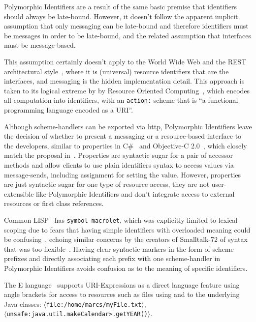\documentclass[preprint]{sigplanconf}
\begin{document}
Polymorphic Identifiers are a result of the same basic premise that identifiers should always be late-bound.  However,
it doesn't follow the apparent implicit assumption that only messaging can be late-bound and therefore identifiers must
be messages in order to be late-bound, and the related assumption that interfaces must be message-based.

This assumption certainly doesn't apply to the World Wide Web and the REST architectural style~\cite{fielding-rest}, where
it is (universal) resource identifiers that are the interfaces, and messaging is the hidden implementation detail.  This 
approach is taken to its logical extreme by  by Resource Oriented Computing~\cite{roc},
which encodes all computation into identifiers, with an {\tt action:} scheme that is ``a functional programming language encoded as a URI''.

Although scheme-handlers can be exported via http, Polymorphic Identifiers leave the decision of whether to present a messaging
or a resource-based interface to the developers,
similar to properties in C\#~\cite{Archer:2001:IC:516715} and Objective-C 2.0~\cite{Kochan:2009:PO:1538451}, which closely match the proposal in~\cite{Spinellis:2002:MPC:510857.510868}.  Properties are syntactic sugar for a pair of accessor methods and allow clients to use 
 plain identifiers syntax to access values via message-sends, including assignment for setting the value.   However, properties
 are just syntactic sugar for one type of resource access, they are not user-extensible like Polymorphic Identifiers 
 and don't integrate access to external resources or first class references.

Common LISP~\cite{Steele:1990:CLL:95411} has {\tt symbol-macrolet}, which was explicitly limited to lexical scoping due to fears 
that having simple identifiers with overloaded meaning could be confusing~\cite{gabriel-lisp-identifiers}, echoing similar concerns by the creators
of Smalltalk-72 of syntax that was too flexible~\cite{Kay:1996:EHS:234286.1057828}.  Having clear syntactic markers in the form of scheme-prefixes
and directly associating each prefix with one scheme-handler in Polymorphic Identifiers avoids confusion as to the meaning of specific identifiers.

The E language~\cite{MillerRobustComposition}  supports URI-Expressions as a direct language feature using angle brackets for access to 
resources such as files using and to the underlying Java classes:   {\tt $\langle$file:/home/marcs/myFile.txt$\rangle$},  \\ {\tt $\langle$unsafe:java.util.makeCalendar>.getYEAR()$\rangle$}.
\end{document}
